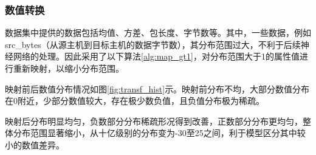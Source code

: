 \subsubsection{数值转换}

数据集中提供的数据包括均值、方差、包长度、字节数等。其中，一些数据，例如src\_bytes（从源主机到目标主机的数据字节数），其分布范围过大，不利于后续神经网络的处理。因此采用了以下算法\ref{alg:map_gt1}，对分布范围大于1的属性值进行重新映射，以缩小分布范围。

映射前后数值分布情况如图\ref{fig:transf_hist}示。映射前分布不均，大部分数值分布在0附近，少部分数值较大，存在极少数负值，且负值分布极为稀疏。

映射后分布明显均匀，负数部分分布稀疏形况得到改善，正数部分分布更均匀，整体分布范围显著缩小，从十亿级别的分布变为-30至25之间，利于模型区分其中较小的数值差异。

